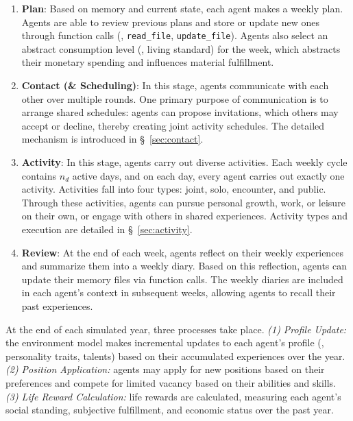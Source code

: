 \begin{enumerate}

\item \textbf{Plan}: 
Based on memory and current state, each agent makes a weekly plan.
Agents are able to review previous plans and store or update new ones through function calls (\eg, \texttt{read\_file}, \texttt{update\_file}).
Agents also select an abstract consumption level (\ie, living standard) for the week, which abstracts their monetary spending and influences material fulfillment.

\item \textbf{Contact (\& Scheduling)}: 
In this stage, agents communicate with each other over multiple rounds.
One primary purpose of communication is to arrange shared schedules: agents can propose invitations, which others may accept or decline, thereby creating joint activity schedules.
The detailed mechanism is introduced in \S~\ref{sec:contact}.

\item \textbf{Activity}: 
In this stage, agents carry out diverse activities.
Each weekly cycle contains $n_d$ active days, and on each day, every agent carries out exactly one activity.
Activities fall into four types: joint, solo, encounter, and public.
Through these activities, agents can pursue personal growth, work, or leisure on their own, or engage with others in shared experiences.
Activity types and execution are detailed in \S~\ref{sec:activity}.

\item \textbf{Review}: 
At the end of each week, agents reflect on their weekly experiences and summarize them into a weekly diary.
Based on this reflection, agents can update their memory files via function calls.
The weekly diaries are included in each agent's context in subsequent weeks, allowing agents to recall their past experiences.

\end{enumerate}

At the end of each simulated year, three processes take place.
\textit{(1) Profile Update:} the environment model makes incremental updates to each agent's profile (\eg, personality traits, talents) based on their accumulated experiences over the year.
\textit{(2) Position Application:} agents may apply for new positions based on their preferences and compete for limited vacancy based on their abilities and skills.
\textit{(3) Life Reward Calculation:} life rewards are calculated, measuring each agent's social standing, subjective fulfillment, and economic status over the past year.

